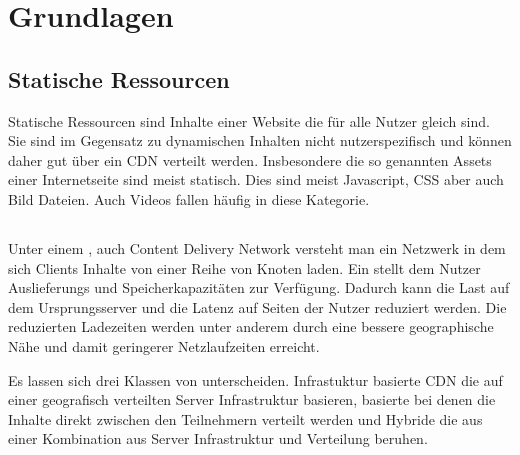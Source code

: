 \chapter{Grundlagen}\label{ch:related_work}

\section{Statische Ressourcen}
Statische Ressourcen sind Inhalte einer Website die für alle Nutzer gleich sind. Sie sind im Gegensatz zu dynamischen Inhalten nicht nutzerspezifisch und können daher gut über ein CDN verteilt werden. Insbesondere die so genannten Assets einer Internetseite sind meist statisch. Dies sind meist Javascript, CSS aber auch Bild Dateien. Auch Videos fallen häufig in diese Kategorie.

\section{\cdn}
Unter einem \cdn, auch Content Delivery Network versteht man ein Netzwerk in dem sich Clients Inhalte von einer Reihe von Knoten laden. Ein \cdn stellt dem Nutzer Auslieferungs und Speicherkapazitäten zur Verfügung. Dadurch kann die Last auf dem Ursprungsserver und die Latenz auf Seiten der Nutzer reduziert werden. Die reduzierten Ladezeiten werden unter anderem durch eine bessere geographische Nähe und damit geringerer Netzlaufzeiten erreicht. %

Es lassen sich drei Klassen von \cdns unterscheiden. Infrastuktur basierte CDN die auf einer geografisch verteilten Server Infrastruktur basieren, \pTp basierte \cdns bei denen die Inhalte direkt zwischen den Teilnehmern verteilt werden und Hybride \cdns die aus einer Kombination aus Server Infrastruktur und \pTp Verteilung beruhen.

